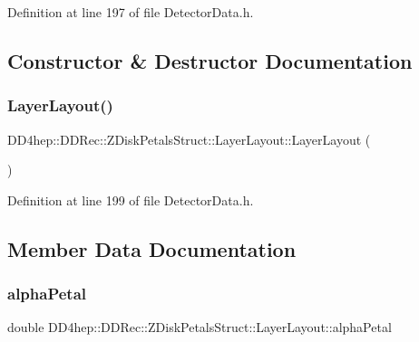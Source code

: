 Definition at line 197 of file Detector\+Data.\+h.



\subsection{Constructor \& Destructor Documentation}
\hypertarget{struct_d_d4hep_1_1_d_d_rec_1_1_z_disk_petals_struct_1_1_layer_layout_ae927543c3f4f96d195e45e75db37b9b8}{}\label{struct_d_d4hep_1_1_d_d_rec_1_1_z_disk_petals_struct_1_1_layer_layout_ae927543c3f4f96d195e45e75db37b9b8} 
\subsubsection{\texorpdfstring{Layer\+Layout()}{LayerLayout()}}
{\footnotesize\ttfamily D\+D4hep\+::\+D\+D\+Rec\+::\+Z\+Disk\+Petals\+Struct\+::\+Layer\+Layout\+::\+Layer\+Layout (\begin{DoxyParamCaption}{ }\end{DoxyParamCaption})\hspace{0.3cm}{\ttfamily [inline]}}



Definition at line 199 of file Detector\+Data.\+h.



\subsection{Member Data Documentation}
\hypertarget{struct_d_d4hep_1_1_d_d_rec_1_1_z_disk_petals_struct_1_1_layer_layout_a8e5089dc9e7157730d3c3773ed6f285c}{}\label{struct_d_d4hep_1_1_d_d_rec_1_1_z_disk_petals_struct_1_1_layer_layout_a8e5089dc9e7157730d3c3773ed6f285c} 
\subsubsection{\texorpdfstring{alpha\+Petal}{alphaPetal}}
{\footnotesize\ttfamily double D\+D4hep\+::\+D\+D\+Rec\+::\+Z\+Disk\+Petals\+Struct\+::\+Layer\+Layout\+::alpha\+Petal}

